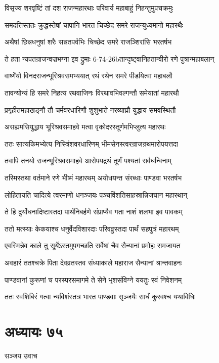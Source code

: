 \twolineshloka
{विसृज्य शरवृष्टिं तां दश राजन्महारथाः}
{परिवार्य महाबाहुं निहन्तुमुपचक्रमुः}


\twolineshloka
{समदत्तिस्ततः क्रुद्धस्तेषां चापानि भारत}
{चिच्छेद समरे राजन्युध्यमानो महारथैः}


\twolineshloka
{अथैषां छिन्नधनुषां शरैः सन्नतपर्वभिः}
{चिच्छेद समरे राजञ्शिरांसि भरतर्षभ}


\twolineshloka
{ते हता न्यपतन्राजन्वज्रभग्ना इव द्रुमाः}
{6-74-26bतान्दृष्ट्वानिहतान्वीरो रणे पुत्रान्महाबलान्}


\twolineshloka
{वार्ष्णेयो विनदराजन्भूरिश्रवसमभ्ययात्}
{रथं रथेन समरे पीडयित्वा महाबलौ}


\twolineshloka
{तावन्योन्यं हि समरे निहत्य रथवाजिनः}
{विरथावभिवल्गन्तौ समेयातां महारथौ}


\twolineshloka
{प्रगृहीतमहाखङ्गौ तौ चर्मवरधारिणौ}
{शुशुभाते नरव्याघ्रौ युद्धाय समवस्थितौ}


\twolineshloka
{असह्यमसियुद्धाय भूरिश्रवसमाहवे}
{मत्वा वृकोदरस्तूर्णमभिप्लुत्य महारथः}


\twolineshloka
{ततः सात्यकिमभ्येत्य निस्त्रिंशवरधारिणम्}
{भीमसेनस्त्वरन्राजन्रथमारोपयत्तदा}


\twolineshloka
{तवापि तनयो राजन्भूरिश्रवसमाहवे}
{आरोपयद्रथं तूर्णं पश्यतां सर्वधन्विनाम्}


\twolineshloka
{तस्मिस्तथा वर्तमाने रणे भीष्मं महारथम्}
{अयोधयन्त संरब्धाः पाण्डवा भरतर्षभ}


\twolineshloka
{लोहितायति चादित्ये त्वरमाणो धनञ्जयः}
{पञ्चविंशतिसाहस्रान्निजघान महारथान्}


\twolineshloka
{ते हि दुर्योधनादिष्टास्तदा पार्थनिबर्हणे}
{संप्राप्यैव गता नाशं शलभा इव पावकम्}


\twolineshloka
{ततो मत्स्याः केकयाश्च धनुर्वेदविशारदाः}
{परिवव्रुस्तदा पार्थं सहपुत्रं महारथम्}


\twolineshloka
{एवस्मिन्नेव काले तु सूर्येऽस्तमुपगच्छति}
{सर्वेषां चैव सैन्यानां प्रमोहः समजायत}


\twolineshloka
{अवहारं ततश्चक्रे पिता देवव्रतस्तव}
{संध्याकाले महाराज सैन्यानां श्रान्तवाहनः}


\twolineshloka
{पाण्डवानां कुरूणां च परस्परसमागमे}
{ते सेने भृशसंविग्ने ययतुः स्वं निवेशनम्}


\twolineshloka
{ततः स्वशिबिरं गत्वा न्यविशंस्तत्र भारत}
{पाण्डवाः सृञ्जयैः सार्धं कुरवश्च यथाविधिः}


\chapter{अध्यायः ७५}
\twolineshloka
{सञ्जय उवाच}
{}


